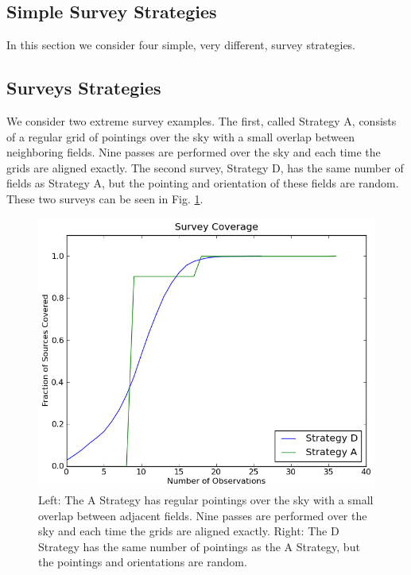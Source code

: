 \documentclass[manuscript]{aastex}
\begin{document}
\subsection{Simple Survey Strategies}
In this section we consider four simple, very different, survey strategies. 



\subsection{Surveys Strategies}
We consider two extreme survey examples. The first, called Strategy A, consists of a regular grid of pointings over the sky with a small overlap between neighboring fields. Nine passes are performed over the sky and each time the grids are aligned exactly. The second survey, Strategy D, has the same number of fields as Strategy A, but the pointing and orientation of these fields are random. These two surveys can be seen in Fig. \ref{fig:surveys}.


\begin{figure}[ht]
\begin{center}
\includegraphics[width=\textwidth]{coverage.png}
\end{center}
\caption{Left: The A Strategy has regular pointings over the sky with a small overlap between adjacent fields. Nine passes are performed over the sky and each time the grids are aligned exactly. Right: The D Strategy has the same number of pointings as the A Strategy, but the pointings and orientations are random.\label{fig:surveys}}
\end{figure}
\end{document}
